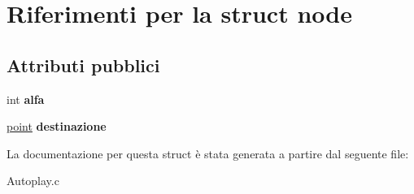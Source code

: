 \hypertarget{structnode}{}\section{Riferimenti per la struct node}
\label{structnode}
\subsection*{Attributi pubblici}
\begin{DoxyCompactItemize}
\item 
\mbox{\label{structnode_af1aae2d4ad0806f835b16c4ca00f2708}} 
int {\bfseries alfa}
\item 
\mbox{\label{structnode_a9ec133b8c40ec70dfeeed4249bab2e85}} 
\hyperlink{structpunto}{point} {\bfseries destinazione}
\end{DoxyCompactItemize}


La documentazione per questa struct è stata generata a partire dal seguente file\+:\begin{DoxyCompactItemize}
\item 
Autoplay.\+c\end{DoxyCompactItemize}
